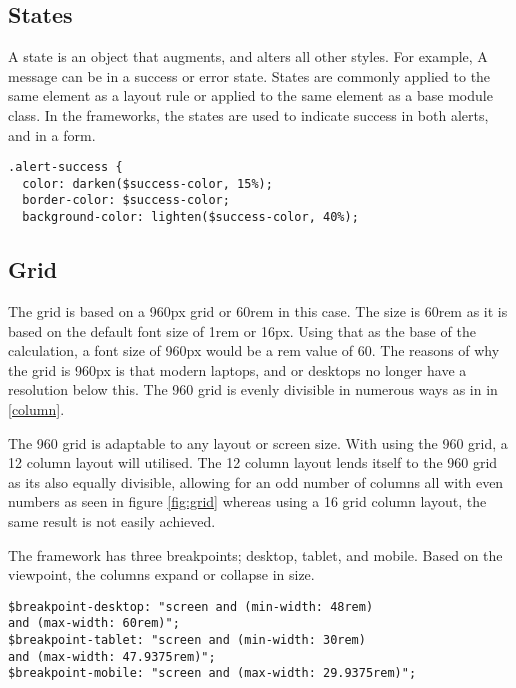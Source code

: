\subsection*{States}
A state is an object that augments, and alters all other styles. For example, A message can be in a success or error state. States are commonly applied to the same element as a layout rule or applied to the same element as a base module class. In the frameworks, the states are used to indicate success in both alerts, and in a form. 

\begin{lstlisting}[language=CSS3]
.alert-success {
  color: darken($success-color, 15%);
  border-color: $success-color;
  background-color: lighten($success-color, 40%);
\end{lstlisting}

\newpage
\subsection*{Grid}

The grid is based on a 960px grid or 60rem in this case. The size is 60rem as it is based on the default font size of 1rem or 16px. Using that as the base of the calculation, a font size of 960px would be a \gls{rem} value of 60. The reasons of why the grid is 960px is that modern laptops, and or desktops no longer have a resolution below this. The 960 grid is evenly divisible in numerous ways as in in \ref{column}. 

The 960 grid is adaptable to any layout or screen size. With using the 960 grid, a 12 column layout will utilised. The 12 column layout lends itself to the 960 grid as its also equally divisible, allowing for an odd number of columns all with even numbers as seen in figure \ref{fig:grid} whereas using a 16 grid column layout, the same result is not easily achieved. 

The framework has three breakpoints; desktop, tablet, and mobile. Based on the viewpoint, the columns expand or collapse in size. 

\begin{lstlisting}[language=CSS3]
$breakpoint-desktop: "screen and (min-width: 48rem) 
and (max-width: 60rem)";
$breakpoint-tablet: "screen and (min-width: 30rem) 
and (max-width: 47.9375rem)";
$breakpoint-mobile: "screen and (max-width: 29.9375rem)";
\end{lstlisting}

